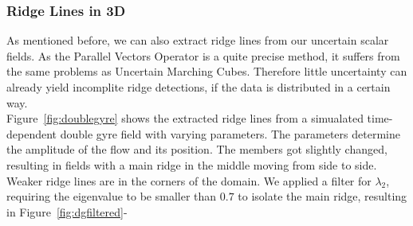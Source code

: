 \subsubsection{Ridge Lines in 3D}\label{sec:evalRL3D}

As mentioned before, we can also extract ridge lines from our uncertain
scalar fields. As the Parallel Vectors Operator is a quite precise
method, it suffers from the same problems as Uncertain Marching Cubes.
Therefore little uncertainty can already yield incomplite ridge
detections, if the data is distributed in a certain way.\\
\indent Figure~\ref{fig:doublegyre} shows the extracted ridge lines from
a simualated time-dependent double gyre field with varying parameters.
The parameters determine the amplitude of the flow and its position. The
members got slightly changed, resulting in fields with a main ridge in
the middle moving from side to side. Weaker ridge lines are in the
corners of the domain. We applied a filter for $\lambda_2$, requiring
the eigenvalue to be smaller than $0.7$ to isolate the main ridge, 
resulting in Figure~\ref{fig:dgfiltered}-


